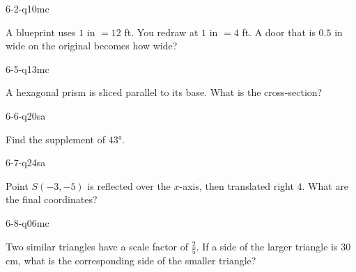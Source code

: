 \begin{practiceQuestion}{6-2-q10}{mc}
\begin{questionText}
A blueprint uses $1$ in $= 12$ ft. You redraw at $1$ in $= 4$ ft. A door that is $0.5$ in wide on the original becomes how wide?
\end{questionText}
\end{practiceQuestion}

\begin{practiceQuestion}{6-5-q13}{mc}
\begin{questionText}
A hexagonal prism is sliced parallel to its base. What is the cross-section?
\end{questionText}
\end{practiceQuestion}

\begin{practiceQuestion}{6-6-q20}{sa}
\begin{questionText}
Find the supplement of $43°$.
\end{questionText}
\end{practiceQuestion}

\begin{practiceQuestion}{6-7-q24}{sa}
\begin{questionText}
Point $S(-3, -5)$ is reflected over the $x$-axis, then translated right $4$. What are the final coordinates?
\end{questionText}
\end{practiceQuestion}

\begin{practiceQuestion}{6-8-q06}{mc}
\begin{questionText}
Two similar triangles have a scale factor of $\frac{2}{5}$. If a side of the larger triangle is $30$ cm, what is the corresponding side of the smaller triangle?
\end{questionText}
\end{practiceQuestion}

